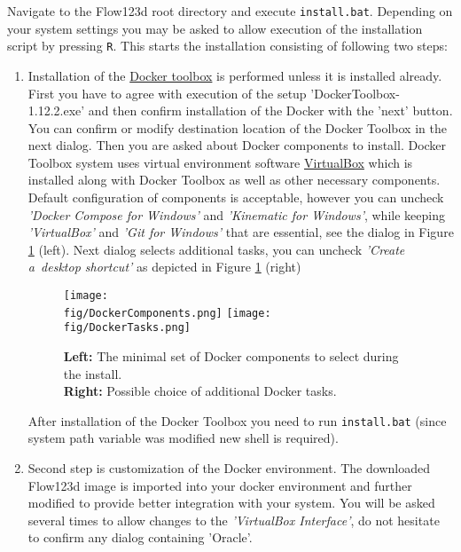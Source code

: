 Navigate to the Flow123d root directory and execute \verb'install.bat'. Depending on your system settings you may be asked to allow 
execution of the installation script by pressing \verb'R'. This starts the installation consisting of following two steps:
\begin{enumerate}
	\item Installation of the \href{https://www.docker.com/products/docker-toolbox}{Docker toolbox} is performed unless it is installed already. 
	First you have to agree with execution of the setup 'DockerToolbox-1.12.2.exe' and then
	confirm installation of the Docker with the 'next' button. You can confirm or modify destination location of the Docker Toolbox in the next dialog.
        Then you are asked about Docker components to install. Docker Toolbox system uses virtual environment software 
        \href{https://www.virtualbox.org/}{VirtualBox} which is installed along with Docker Toolbox as well as other necessary components.
        Default configuration of components is acceptable, however you can uncheck 
        \emph{'Docker Compose for Windows'} and \emph{'Kinematic for Windows'}, while keeping \emph{'VirtualBox'} and \emph{'Git for Windows'} that are essential,
        see the dialog in Figure \ref{fig:DockerComponents} (left). Next dialog selects additional tasks, you can uncheck \emph{'Create a~desktop shortcut'} as 
        depicted in Figure \ref{fig:DockerComponents} (right)
        \begin{figure}
          \center  
          \texttt{[image: \\fig/DockerComponents.png]}%
          \hspace{2ex}
          \texttt{[image: \\fig/DockerTasks.png]}
          \caption{{\bf Left:} The minimal set of Docker components to select during the install.\\
                   {\bf Right:} Possible choice of additional Docker tasks.} 
          \label{fig:DockerComponents}
        \end{figure}
	After installation of the Docker Toolbox you need to run \verb'install.bat' (since system path variable was modified new shell is required). 
	\item Second step is customization of the Docker environment. The downloaded Flow123d image is imported into your docker environment 
	and further modified to provide better integration with your system.
	You will be asked several times to allow changes to the \emph{'VirtualBox Interface'}, do not hesitate to confirm any dialog containing 'Oracle'.
		

\end{enumerate}
